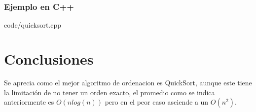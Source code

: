 \documentclass[8pt, A4]{article}    %
\newcommand{\grisclaro}{\color[gray]{0.99}}
\newcommand{\showprog}[1]
{
\begin{minipage}{\textwidth}

 {code/#1}
\end{minipage} 
}
\begin{document}
\subsubsection{Ejemplo en C++}

\showprog{quicksort.cpp}


\section{Conclusiones}
Se aprecia como el mejor algoritmo de ordenacion es QuickSort, aunque este tiene la limitación de no tener un orden exacto, el promedio como se indica anteriormente es $O(nlog(n))$ pero en el peor caso asciende a un  $O(n^2)$.
\end{document}
